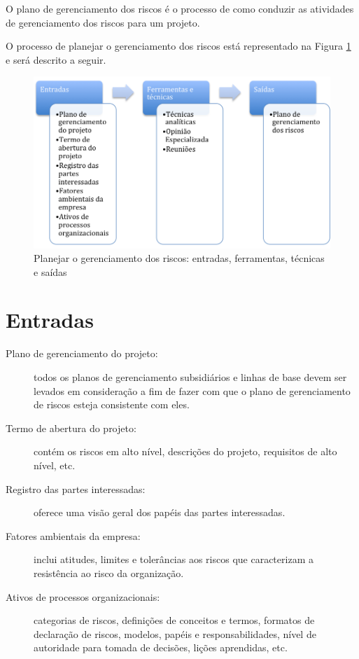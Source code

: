 
O plano de gerenciamento dos riscos é o processo de como conduzir as atividades de gerenciamento dos riscos para um projeto.

O processo de planejar o gerenciamento dos riscos está representado na Figura \ref{fig:riscos:plan:efts} e será descrito a seguir.

\begin{figure}[!h]
	\centering
	\includegraphics[scale=0.5]{Figuras/riscos_efts_planejar.png}
	\caption{Planejar o gerenciamento dos riscos: entradas, ferramentas, técnicas e saídas}
	\label{fig:riscos:plan:efts}
\end{figure}

\section{Entradas}

\begin{description}
	
	\item[Plano de gerenciamento do projeto:] todos os planos de gerenciamento subsidiários e linhas de base devem ser levados em consideração a fim de fazer com que o plano de gerenciamento de riscos esteja consistente com eles.
	
	\item[Termo de abertura do projeto:] contém os riscos em alto nível, descrições do projeto, requisitos de alto nível, etc.
	
	\item[Registro das partes interessadas:] oferece uma visão geral dos papéis das partes interessadas.
	
	\item[Fatores ambientais da empresa:] inclui atitudes, limites e tolerâncias aos riscos que caracterizam a resistência ao risco da organização.
	
	\item[Ativos de processos organizacionais:] categorias de riscos, definições de conceitos e termos, formatos de declaração de riscos, modelos, papéis e responsabilidades, nível de autoridade para tomada de decisões, lições aprendidas, etc.

\end{description}

